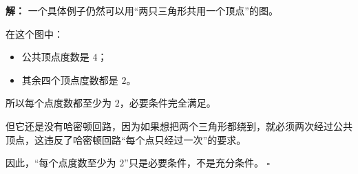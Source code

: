 \documentclass[11pt,a4paper,fontset=fandol]{ctexart}
\theoremstyle{formalexample}
\newenvironment{solution}{\par\noindent\textbf{解：}}{\hfill$\square$\par}
\begin{document}
\begin{enumerate}
\begin{solution}
  一个具体例子仍然可以用“两只三角形共用一个顶点”的图。

  在这个图中：
  \begin{itemize}
    \item 公共顶点度数是 $4$；
    \item 其余四个顶点度数都是 $2$。
  \end{itemize}

  所以每个点度数都至少为 $2$，必要条件完全满足。

  但它还是没有哈密顿回路，因为如果想把两个三角形都绕到，就必须两次经过公共顶点，这违反了哈密顿回路“每个点只经过一次”的要求。

  因此，“每个点度数至少为 $2$”只是必要条件，不是充分条件。
  \end{solution}
\end{enumerate}
\end{document}

